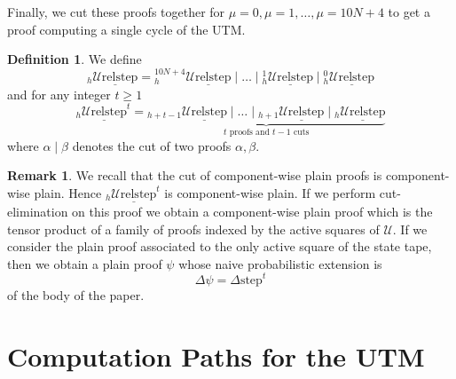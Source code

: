 \documentclass[english,letter paper,12pt,reqno]{article}
\theoremstyle{definition}
\newtheorem{definition}[theorem]{Definition}
\newtheorem{remark}[theorem]{Remark}
\begin{document}
Finally, we cut these proofs together for $\mu = 0, \mu = 1, \ldots, \mu = 10N + 4$ to get a proof computing a single cycle of the UTM.

\begin{definition}\label{defn:urelstep_t} We define
    \begin{equation}
        {}_h\underline{\text{$\mathcal{U}$relstep}} = {}_h^{10N+4}\underline{\text{$\mathcal{U}$relstep}} \mid \ldots \mid {}_h^{1}\underline{\text{$\mathcal{U}$relstep}}
        \mid
        {}_h^{0}\underline{\text{$\mathcal{U}$relstep}}
    \end{equation}
    and for any integer $t \ge 1$
    \begin{equation}
        {}_h\underline{\text{$\mathcal{U}$relstep}}^t = \underset{t \text{ proofs and } t - 1 \text{ cuts}}{\underbrace{{}_{h+t-1}\underline{\text{$\mathcal{U}$relstep}} \mid \ldots \mid {}_{h+1}\underline{\text{$\mathcal{U}$relstep}}
        \mid
        {}_h\underline{\text{$\mathcal{U}$relstep}}}}
    \end{equation}
where $\alpha \mid \beta$ denotes the cut of two proofs $\alpha, \beta$.
\end{definition}

\begin{remark}
    We recall that the cut of component-wise plain proofs is component-wise plain. Hence ${}_h\underline{\text{$\mathcal{U}$relstep}}^t$ is component-wise plain. If we perform cut-elimination on this proof we obtain a component-wise plain proof which is the tensor product of a family of proofs indexed by the active squares of $\mathcal{U}$. If we consider the plain proof associated to the only active square of the state tape, then we obtain a plain proof $\psi$ whose naive probabilistic extension is
    \begin{equation}
        \Delta \psi = \Delta \text{step}^t
    \end{equation}
    of the body of the paper.
\end{remark}

\section{Computation Paths for the UTM}\label{section:comp_path_utm}
\end{document}
